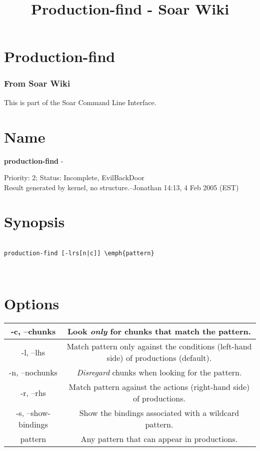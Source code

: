 \documentclass[10pt]{article}
\title{Production-find - Soar Wiki}
\begin{document}
\section*{Production-find}
\subsubsection*{From Soar Wiki}


 This is part of the Soar Command Line Interface. 
\section*{ Name }


 \textbf{production-find}
 - 


 Priority: 2; Status: Incomplete, EvilBackDoor\\ 
Result generated by kernel, no structure.--Jonathan 14:13, 4 Feb 2005 (EST) 
\section*{ Synopsis }
\begin{verbatim}

production-find [-lrs[n|c]] \emph{pattern}



\end{verbatim}
\section*{ Options }


\begin{tabular}{|c|c|}
\hline 
 -c, --chunks  & Look \emph{only}
 for chunks that match the pattern.  \\
 \hline 
 -l, --lhs  & Match pattern only against the conditions (left-hand side) of productions (default).  \\
 \hline 
 -n, --nochunks  &\emph{Disregard}
 chunks when looking for the pattern.  \\
 \hline 
 -r, --rhs  & Match pattern against the actions (right-hand side) of productions.  \\
 \hline 
 -s, --show-bindings  & Show the bindings associated with a wildcard pattern.  \\
 \hline 
 pattern  & Any pattern that can appear in productions.  \\
 \hline 

\end{tabular}
\end{document}
